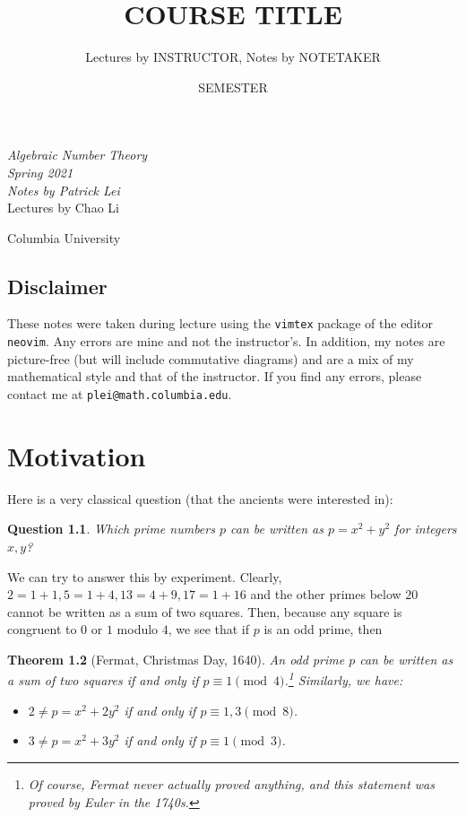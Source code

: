 \documentclass[leqno, openany]{memoir}
\title{COURSE TITLE}
\author{Lectures by INSTRUCTOR, Notes by NOTETAKER}
\date{SEMESTER}
\newtheorem{thm}{Theorem}[section]
\newtheorem{quest}[thm]{Question}
\theoremstyle{definition}
\theoremstyle{remark}
\theoremstyle{plain}
\theoremstyle{definition}
\theoremstyle{remark}
\newcommand*{\titleSW}
    {\begingroup%
    \raggedleft
    \vspace*{\baselineskip}
    {\Huge\itshape Algebraic Number Theory \\ Spring 2021}\\[\baselineskip]
    {\large\itshape Notes by Patrick Lei}\\[0.2\textheight]
    {\Large Lectures by Chao Li}\par
    \vfill
    {\Large \sffamily Columbia University}
    \vspace*{\baselineskip}
\endgroup}
\begin{document}
    
\begin{titlingpage}
\titleSW
\end{titlingpage}

\thispagestyle{empty}
\section*{Disclaimer}%
\label{sec:disclaimer}

These notes were taken during lecture using the \texttt{vimtex} package of the editor \texttt{neovim}. 
Any errors are mine and not the instructor's. 
In addition, my notes are picture-free (but will include commutative diagrams) and are a mix of my mathematical style and that of the instructor.
If you find any errors, please contact me at \texttt{plei@math.columbia.edu}.

\newpage

\tableofcontents


\chapter{Motivation}%
\label{cha:motivation}

Here is a very classical question (that the ancients were interested in):

\begin{quest}
    Which prime numbers $p$ can be written as $p = x^2 + y^2$ for integers $x,y$?
\end{quest}

We can try to answer this by experiment. Clearly, $2=1+1,5=1+4,13=4+9,17=1+16$ and the other primes below $20$ cannot be written as a sum of two squares. Then, because any square is congruent to $0$ or $1$ modulo $4$, we see that if $p$ is an odd prime, then

\begin{thm}[Fermat, Christmas Day, 1640]
    An odd prime $p$ can be written as a sum of two squares if and only if $p \equiv 1 \pmod 4$.\footnote{Of course, Fermat never actually proved anything, and this statement was proved by Euler in the 1740s.} Similarly, we have:
\begin{itemize}
    \item $2 \neq p = x^2 + 2y^2$ if and only if $p \equiv 1,3 \pmod 8$.
    \item $3 \neq p = x^2 + 3y^2$ if and only if $p \equiv 1 \pmod 3$.
\end{itemize}
\end{thm}
\end{document}
